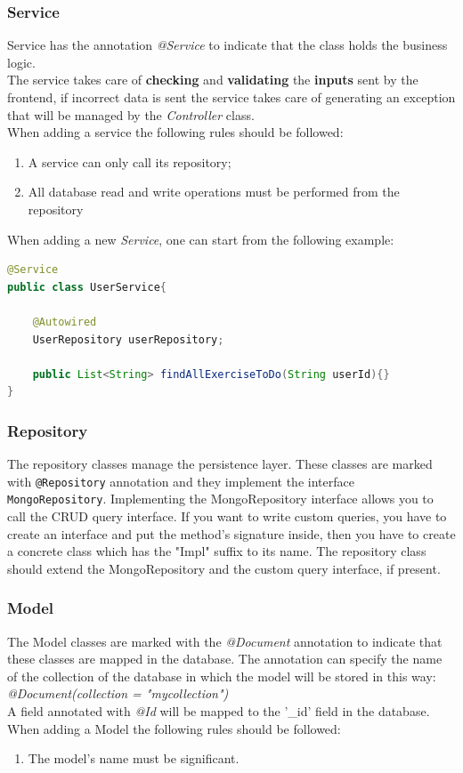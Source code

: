 \subsubsection{Service}
Service has the annotation \textit{@Service} to indicate that the class holds the business logic.\\
The service takes care of \textbf{checking} and \textbf{validating} the \textbf{inputs} sent by the frontend, if incorrect data is sent the service takes care of generating an exception that will be managed by the \textit{Controller} class.\\
When adding a service the following rules should be followed: 
\begin{enumerate}
\item A service can only call its repository;
\item All database read and write operations must be performed from the repository
\end{enumerate}
When adding a new \textit{Service}, one can start from the following example:
\begin{lstlisting}[language=Java]
@Service
public class UserService{

	@Autowired
	UserRepository userRepository; 
	
	public List<String> findAllExerciseToDo(String userId){} 
}
\end{lstlisting}

\subsubsection{Repository}
The repository classes manage the persistence layer. These classes are marked with \texttt{@Repository} annotation and they implement the interface \texttt{MongoRepository}. Implementing the MongoRepository interface allows you to call the CRUD query interface. 
If you want to write custom queries, you have to create an interface and put the method's signature inside, then you have to create a concrete class which has the "Impl" suffix to its name. The repository class should extend the MongoRepository and the custom query interface, if present. 


\subsubsection{Model}
The Model classes are marked with the \textit{@Document} annotation to indicate that these classes are mapped in the database. The annotation can specify the name of the collection of the database in which the model will be stored in this way:\\ \textit{@Document(collection = "mycollection")}\\
A field annotated with \textit{@Id} will be mapped to the '\_id' field in the database.\\
When adding a Model the following rules should be followed: 
\begin{enumerate}
\item The model's name must be significant.
\end{enumerate}

